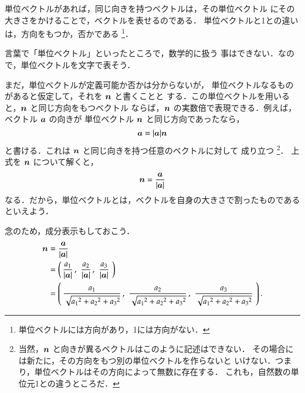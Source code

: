                 単位ベクトルがあれば，同じ向きを持つベクトルは，その単位ベクトル
                にその大きさをかけることで，ベクトルを表せるのである．
                単位ベクトルと1との違いは，方向をもつか，否かである
                    \footnote{
                        単位ベクトルには方向があり，1には方向がない．
                    }．

                言葉で「単位ベクトル」といったところで，数学的に扱う
                事はできない．なので，単位ベクトルを文字で表そう．

                まだ，単位ベクトルが定義可能か否かは分からないが，
                単位ベクトルなるものがあると仮定して，それを $\boldsymbol{n}$ と書くことと
                する．この単位ベクトルを用いると，$\boldsymbol{n}$ と同じ方向をもつベクトル
                ならば，$\boldsymbol{n}$ の実数倍で表現できる．例えば，ベクトル $\boldsymbol{a}$ の向きが
                単位ベクトル $\boldsymbol{n}$ と同じ方向であったなら，
                    \begin{equation*}
                        \boldsymbol{a} = | \boldsymbol{a} | \boldsymbol{n}
                    \end{equation*}
                と書ける．これは $\boldsymbol{n}$ と同じ向きを持つ任意のベクトルに対して
                成り立つ
                    \footnote{
                        当然，$\boldsymbol{n}$ と向きが異るベクトルはこのように記述はできない．
                        その場合には新たに，その方向をもつ別の単位ベクトルを作らないと
                        いけない．つまり，単位ベクトルはその方向によって無数に存在する．
                        これも，自然数の単位元1との違うところだ．
                    }．
                上式を $\boldsymbol{n}$ について解くと，
                    \begin{align}
                        \boldsymbol{n} = \frac{\boldsymbol{a}}{|\boldsymbol{a}|}
                    \end{align}
                なる．だから，単位ベクトルとは，ベクトルを自身の大きさで割ったものである
                といえよう．

                念のため，成分表示もしておこう．
                    \begin{align*}
                        \boldsymbol{n} &= \frac{\boldsymbol{a}}{|\boldsymbol{a}|} \\
                            &= \left(
                                    \,\frac{a_{1}}{|\boldsymbol{a}|}\,,\,
                                    \,\frac{a_{2}}{|\boldsymbol{a}|}\,,\,
                                    \,\frac{a_{3}}{|\boldsymbol{a}|}\,\,
                               \right) \\
                            &= \left(
                                    \,\frac{a_{1}}{\sqrt{{a_{1}}^{2}+{a_{2}}^{2}+{a_{3}}^{2}}}\,,\,
                                    \,\frac{a_{2}}{\sqrt{{a_{1}}^{2}+{a_{2}}^{2}+{a_{3}}^{2}}}\,,\,
                                    \,\frac{a_{3}}{\sqrt{{a_{1}}^{2}+{a_{2}}^{2}+{a_{3}}^{2}}}\,\,
                               \right).
                    \end{align*}

